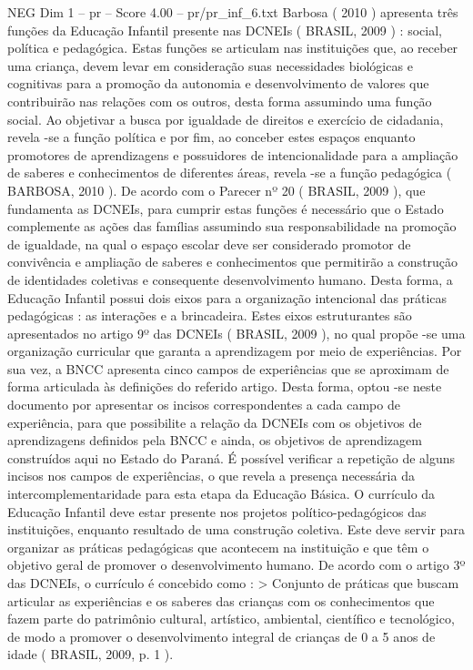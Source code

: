 \begin{textsample}{NEG Dim 1 – pr – Score 4.00 – pr/pr\_inf\_6.txt}  \label{ex:f1_neg_263}
Barbosa ( 2010 ) apresenta três funções da Educação Infantil presente nas DCNEIs ( BRASIL, 2009 ) : social, política e pedagógica.
Estas funções se articulam nas instituições que, ao receber uma criança, devem levar em consideração suas necessidades biológicas e cognitivas para a promoção da autonomia e desenvolvimento de valores que contribuirão nas relações com os outros, desta forma assumindo uma função social.
Ao objetivar a busca por igualdade de direitos e exercício de cidadania, revela -se a função política e por fim, ao conceber estes espaços enquanto promotores de aprendizagens e possuidores de intencionalidade para a ampliação de saberes e conhecimentos de diferentes áreas, revela -se a função pedagógica ( BARBOSA, 2010 ).
De acordo com o Parecer nº 20 ( BRASIL, 2009 ), que fundamenta as DCNEIs, para cumprir estas funções é necessário que o Estado complemente as ações das famílias assumindo sua responsabilidade na promoção de igualdade, na qual o espaço escolar deve ser considerado promotor de convivência e ampliação de saberes e conhecimentos que permitirão a construção de identidades coletivas e consequente desenvolvimento humano.
Desta forma, a Educação Infantil possui dois eixos para a organização intencional das práticas pedagógicas : as interações e a brincadeira.
Estes eixos estruturantes são apresentados no artigo 9º das DCNEIs ( BRASIL, 2009 ), no qual propõe -se uma organização curricular que garanta a aprendizagem por meio de experiências.
Por sua vez, a BNCC apresenta cinco campos de experiências que se aproximam de forma articulada às definições do referido artigo.
Desta forma, optou -se neste documento por apresentar os incisos correspondentes a cada campo de experiência, para que possibilite a relação da DCNEIs com os objetivos de aprendizagens definidos pela BNCC e ainda, os objetivos de aprendizagem construídos aqui no Estado do Paraná.
É possível verificar a repetição de alguns incisos nos campos de experiências, o que revela a presença necessária da intercomplementaridade para esta etapa da Educação Básica.
O currículo da Educação Infantil deve estar presente nos projetos político-pedagógicos das instituições, enquanto resultado de uma construção coletiva.
Este deve servir para organizar as práticas pedagógicas que acontecem na instituição e que têm o objetivo geral de promover o desenvolvimento humano.
De acordo com o artigo 3º das DCNEIs, o currículo é concebido como : > Conjunto de práticas que buscam articular as experiências e os saberes das crianças com os conhecimentos que fazem parte do patrimônio cultural, artístico, ambiental, científico e tecnológico, de modo a promover o desenvolvimento integral de crianças de 0 a 5 anos de idade ( BRASIL, 2009, p. 1 ).

\end{textsample}
